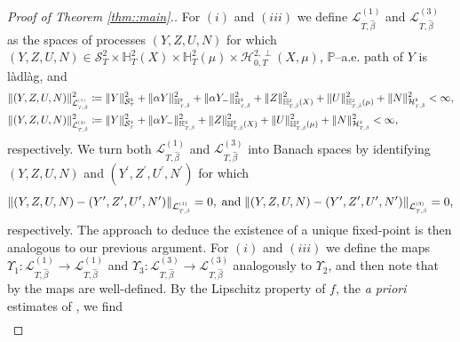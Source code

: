 \documentclass[10pt]{article} %
\newcommand\cH{\mathcal H}
\newcommand\cL{\mathcal L}
\newcommand\cS{\mathcal S}
\newcommand{\smalltext}[1]{\text{\fontsize{4}{4}\selectfont$#1$}}
\def \H{\mathbb{H}}
\def \P{\mathbb{P}}
\newcommand{\1}{\mathbf{1}}
\begin{document}
\begin{proof}[Proof of Theorem \ref{thm::main}.]
	\medskip
	For $(i)$ and $(iii)$ we define $\cL^{(1)}_{T,\hat\beta}$ and $\cL^{(3)}_{T,\hat\beta}$ as the spaces of processes $(Y,Z,U,N)$ for which $(Y,Z,U,N) \in  \cS^2_T \times \H^2_T(X) \times \H^2_T(\mu) \times \cH^{2,\perp}_{0,T}(X,\mu)$, $\P$--a.e. path of $Y$ is l\`adl\`ag, and
	\begin{align*}
		\|(Y,Z,U,N)\|^2_{\cL^\smalltext{(1)}_{\smalltext{T}\smalltext{,}\smalltext{\hat\beta}}} &\coloneqq \|Y\|^2_{\cS^\smalltext{2}_\smalltext{T}} + \|\alpha Y\|^2_{\H^\smalltext{2}_{\smalltext{T}\smalltext{,}\smalltext{\hat\beta}}} + \|\alpha Y_-\|^2_{\H^\smalltext{2}_{\smalltext{T}\smalltext{,}\smalltext{\hat\beta}}} + \|Z\|^2_{\H^\smalltext{2}_{\smalltext{T}\smalltext{,}\smalltext{\hat\beta}}(X)} + \|U\|^2_{\H^\smalltext{2}_{\smalltext{T}\smalltext{,}\smalltext{\hat\beta}}(\mu)} + \|N\|^2_{\cH^\smalltext{2}_{\smalltext{T}\smalltext{,}\smalltext{\hat\beta}}} < \infty,\\
		\|(Y,Z,U,N)\|^2_{\cL^\smalltext{(3)}_{\smalltext{T}\smalltext{,}\smalltext{\hat\beta}}} &\coloneqq \|Y\|^2_{\cS^\smalltext{2}_\smalltext{T}} + \|\alpha Y_-\|^2_{\H^\smalltext{2}_{\smalltext{T}\smalltext{,}\smalltext{\hat\beta}}} + \|Z\|^2_{\H^\smalltext{2}_{\smalltext{T}\smalltext{,}\smalltext{\hat\beta}}(X)} + \|U\|^2_{\H^\smalltext{2}_{\smalltext{T}\smalltext{,}\smalltext{\hat\beta}}(\mu)} + \|N\|^2_{\cH^\smalltext{2}_{\smalltext{T}\smalltext{,}\smalltext{\hat\beta}}} < \infty,
	\end{align*}
	respectively. We turn both $\cL^{(1)}_{T,\hat\beta}$ and $\cL^{(3)}_{T,\hat\beta}$ into Banach spaces by identifying $(Y,Z,U,N)$ and $(Y^\prime,Z^\prime,U^\prime,N^\prime)$ for which 
	\begin{equation*}
		\|(Y,Z,U,N) - (Y^\prime,Z^\prime,U^\prime,N^\prime)\|_{\cL^\smalltext{(1)}_{\smalltext{T}\smalltext{,}\smalltext{\hat\beta}}} = 0, \; \text{and} \; \|(Y,Z,U,N) - (Y^\prime,Z^\prime,U^\prime,N^\prime)\|_{\cL^\smalltext{(3)}_{\smalltext{T}\smalltext{,}\smalltext{\hat\beta}}} = 0,
	\end{equation*}
	respectively. The approach to deduce the existence of a unique fixed-point is then analogous to our previous argument. For $(i)$ and $(iii)$ we define the maps $\Upsilon_1 : \cL^{(1)}_{T,\hat\beta} \longrightarrow \cL^{(1)}_{T,\hat\beta}$ and $\Upsilon_3 : \cL^{(3)}_{T,\hat\beta} \longrightarrow \cL^{(3)}_{T,\hat\beta}$ analogously to $\Upsilon_2$, and then note that by  the maps are well-defined. By the Lipschitz property of $f$, the \emph{a priori} estimates of , we find
	\begin{align*}

\end{align*}
\end{proof}
\end{document}
